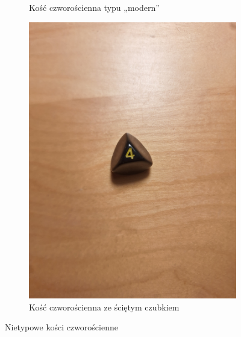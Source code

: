 \begin{figure}[H]
\begin{subfigure}{.5\textwidth}
        \caption{\label{fig:modern_k4}Kość czworościenna typu „modern”}
      \end{subfigure}%
      \begin{subfigure}{.5\textwidth}
        \includegraphics[width=.9\linewidth, trim={250mm 200mm 350mm 150mm}, clip]{chapters/02-teoria/figures/nietypowe_k4}
        \caption{\label{fig:nietypowe_k4}Kość czworościenna ze ściętym czubkiem}
      \end{subfigure}%
    \caption{Nietypowe kości czworościenne}
    \label{fig:nietypowe_modern_k4}
\end{figure}